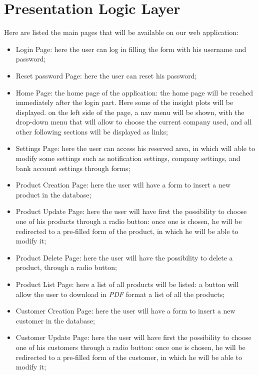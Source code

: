 \newpage
\section{Presentation Logic Layer}


Here are listed the main pages that will be available on our web application:

\begin{itemize}
    \item Login Page: here the user can log in filling the form with his username and password;
    \item Reset password Page: here the user can reset his password;
    \item Home Page: the home page of the application: the home page will be reached immediately after the login part. Here some of the insight plots will be displayed. on the left side of the page, a nav menu will be shown, with the drop-down menu that will allow to choose the current company used, and all other following sections will be displayed as links;
    \item Settings Page: here the user can access his reserved area, in which will able to modify some settings such as notification settings, company settings, and bank account settings through forms;
    \item Product Creation Page: here the user will have a form to insert a new product in the database;
    \item Product Update Page: here the user will have first the possibility to choose one of his products through a radio button: once one is chosen, he will be redirected to a pre-filled form of the product, in which he will be able to modify it;
    \item Product Delete Page: here the user will have the possibility to delete a product, through a radio button;
    \item Product List Page: here a list of all products will be listed: a button will allow the user to download in \textit{PDF} format a list of all the products;
    \item Customer Creation Page: here the user will have a form to insert a new customer in the database;
    \item Customer Update Page: here the user will have first the possibility to choose one of his customers through a radio button: once one is chosen, he will be redirected to a pre-filled form of the customer, in which he will be able to modify it;

\end{itemize}
